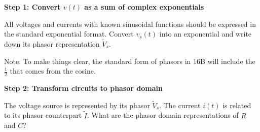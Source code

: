 \begin{enumerate}

\qitem \textbf{Step 1: Convert $v(t)$ as a sum of complex exponentials}

All voltages and currents with known sinusoidal functions should be expressed in the standard exponential format.
Convert $v_s(t)$ into an exponential and write down its phasor representation $\widetilde{V}_s$.

Note: To make things clear, the standard form of phasors in 16B will include the $\frac{1}{2}$ that comes from the cosine.




\qitem \textbf{Step 2: Transform circuits to phasor domain}

The voltage source is represented by its phasor $\widetilde{V}_s$.
The current $i(t)$ is related to its phasor counterpart $\widetilde{I}$. 
What are the phasor domain representations of $R$ and $C$?


\end{enumerate}
